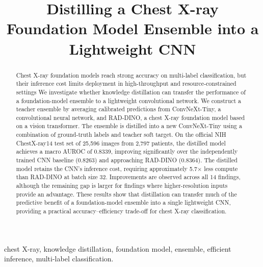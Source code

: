 \documentclass[conference]{IEEEtran}
\begin{document}
\title{Distilling a Chest X-ray Foundation Model Ensemble into a Lightweight CNN}

\author{
}

\maketitle

\begin{abstract}
Chest X-ray foundation models reach strong accuracy on multi-label classification, but their inference cost limits deployment in high-throughput and resource-constrained settings We investigate whether knowledge distillation can transfer the performance of a foundation-model ensemble to a lightweight convolutional network. We construct a teacher ensemble by averaging calibrated predictions from ConvNeXt-Tiny, a convolutional neural network, and RAD-DINO, a chest X-ray foundation model based on a vision transformer. The ensemble is distilled into a new ConvNeXt-Tiny using a combination of ground-truth labels and teacher soft target.  On the official NIH ChestX-ray14 test set of 25,596 images from 2,797 patients, the distilled model achieves a macro AUROC of 0.8339, improving significantly over the independently trained CNN baseline (0.8263) and approaching RAD-DINO (0.8364). The distilled model retains the CNN's inference cost, requiring approximately 5.7$\times$ less compute than RAD-DINO at batch size 32. Improvements are observed across all 14 findings, although the remaining gap is larger for findings where higher-resolution inputs provide an advantage. These results show that distillation can transfer much of the predictive benefit of a foundation-model ensemble into a single lightweight CNN, providing a practical accuracy--efficiency trade-off for chest X-ray classification.
\end{abstract}


\begin{IEEEkeywords}
chest X-ray, knowledge distillation, foundation model, ensemble, efficient inference, multi-label classification.
\end{IEEEkeywords}

\end{document}
